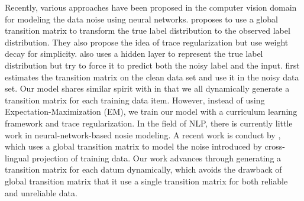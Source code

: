 
Recently, various approaches have been proposed in the computer vision domain for modeling the data noise using neural networks.
\cite{sukhbaatar2014training} proposes to use a global transition matrix to transform the true label distribution to the observed label distribution. They also propose the idea of trace regularization but use weight decay for simplicity. \cite{reed2014training} also uses a hidden layer to represent the true label distribution but try to force it to predict both the noisy label and the input. \cite{chen2015webly,xiao2015learning} first estimates the transition matrix on the clean data set and use it in the noisy data set. 
Our model shares similar spirit with \cite{misra2016seeing} in that we all dynamically generate a transition matrix for each
training data item. 
However, instead of using Expectation-Maximization (EM), we train our model with a curriculum learning framework and trace regularization.
In the field of NLP, there is currently little work in neural-network-based nosie modeling. A recent work is conduct by \cite{fang2016learning}, which uses a global transition matrix to model the noise introduced by
cross-lingual projection of training data. Our work advances \cite{fang2016learning} through generating a transition matrix for each datum dynamically, which avoids the drawback of global transition matrix that it use a single transition matrix for both reliable and unreliable data. 



